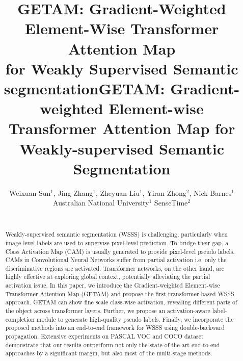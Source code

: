 \documentclass[10pt,twocolumn,letterpaper]{article}
\begin{document}
\title{GETAM: Gradient-Weighted Element-Wise Transformer Attention Map \\for Weakly Supervised Semantic segmentation}

\title{GETAM: Gradient-weighted Element-wise Transformer Attention Map for Weakly-supervised Semantic Segmentation}

\author{Weixuan Sun$^1$, Jing Zhang$^1$, Zheyuan Liu$^1$, Yiran Zhong$^2$, Nick Barnes$^1$\\
Australian National University$^1$    SenseTime$^2$  \\
\\
}
\maketitle

\begin{abstract}
Weakly-supervised semantic segmentation (WSSS) is
challenging, particularly when 
image-level labels are used to supervise pixel-level prediction. To bridge their gap, a Class Activation Map (CAM) is usually generated to provide pixel-level pseudo labels. 
CAMs in Convolutional Neural Networks suffer from partial activation i.e. only the discriminative regions are activated.
Transformer networks, on the other hand, are highly effective at exploring global context,
potentially alleviating the partial activation issue. 
In this paper, we introduce the Gradient-weighted Element-wise Transformer Attention Map (GETAM) and propose the first transformer-based WSSS approach.
GETAM can
show fine scale class-wise activation, revealing different parts of the object across transformer layers. 
Further, we propose an activation-aware label-completion module to generate high-quality pseudo labels. 
Finally, we incorporate the proposed methods into an end-to-end framework for WSSS using double-backward propagation. 
Extensive experiments on PASCAL VOC and COCO dataset demonstrate that our results outperform
not only the state-of-the-art end-to-end approaches by a significant margin, but also most of
the multi-stage methods.
\end{abstract}









\maketitle
\end{document}

